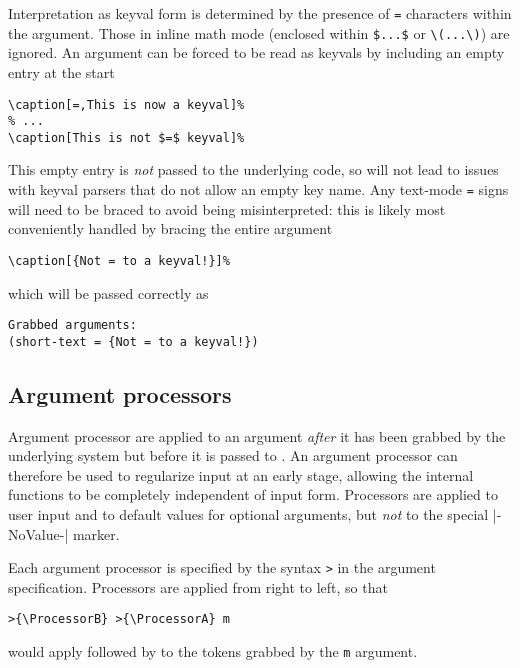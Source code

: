 \documentclass{ltxguide}
\begin{document}
Interpretation as keyval form is determined by the presence of \texttt{=}
characters within the argument. Those in inline math mode (enclosed within
\verb|$...$| or \verb|\(...\)|) are ignored. An argument can be forced to be
read as keyvals by including an empty entry at the start
\begin{verbatim}
\caption[=,This is now a keyval]%
% ...
\caption[This is not $=$ keyval]%
\end{verbatim}

This empty entry is \emph{not} passed to the underlying code, so will not lead
to issues with keyval parsers that do not allow an empty key name. Any text-mode
\texttt{=} signs will need to be braced to avoid being misinterpreted: this
is likely most conveniently handled by bracing the entire argument
\begin{verbatim}
\caption[{Not = to a keyval!}]%
\end{verbatim}
which will be passed correctly as
\begin{verbatim}
Grabbed arguments:
(short-text = {Not = to a keyval!})
\end{verbatim}

\subsection{Argument processors}
\label{sec:cmd:processors}

Argument processor are applied to an argument \emph{after} it has been grabbed
by the underlying system but before it is passed to . An argument
processor can therefore be used to regularize input at an early stage, allowing
the internal functions to be completely independent of input form. Processors
are applied to user input and to default values for optional arguments, but
\emph{not} to the special |-NoValue-| marker.

Each argument processor is specified by the syntax \texttt{>}
in the argument specification. Processors are applied from right to left, so
that
\begin{verbatim}
>{\ProcessorB} >{\ProcessorA} m
\end{verbatim}
would apply  followed by  to the tokens grabbed
by the \texttt{m} argument.
\end{document}
